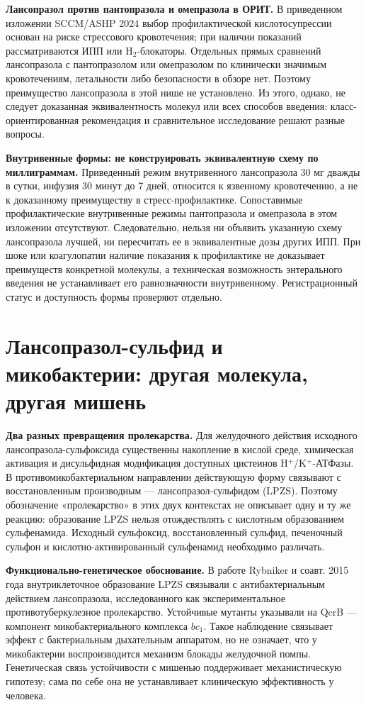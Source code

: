 \documentclass[11pt,a4paper,notitlepage]{report}
\newcommand{\src}[1]{\unskip\space\cite{#1}}
\begin{document}
\textbf{Лансопразол против пантопразола и омепразола в ОРИТ.} В приведенном изложении SCCM/ASHP 2024 выбор профилактической кислотосупрессии основан на риске стрессового кровотечения; при наличии показаний рассматриваются ИПП или H$_2$-блокаторы. Отдельных прямых сравнений лансопразола с пантопразолом или омепразолом по клинически значимым кровотечениям, летальности либо безопасности в обзоре нет. Поэтому преимущество лансопразола в этой нише не установлено. Из этого, однако, не следует доказанная эквивалентность молекул или всех способов введения: класс-ориентированная рекомендация и сравнительное исследование решают разные вопросы.\src{sccm}

\textbf{Внутривенные формы: не конструировать эквивалентную схему по миллиграммам.} Приведенный режим внутривенного лансопразола 30 мг дважды в сутки, инфузия 30 минут до 7 дней, относится к язвенному кровотечению, а не к доказанному преимуществу в стресс-профилактике. Сопоставимые профилактические внутривенные режимы пантопразола и омепразола в этом изложении отсутствуют. Следовательно, нельзя ни объявить указанную схему лансопразола лучшей, ни пересчитать ее в эквивалентные дозы других ИПП. При шоке или коагулопатии наличие показания к профилактике не доказывает преимуществ конкретной молекулы, а техническая возможность энтерального введения не устанавливает его равнозначности внутривенному. Регистрационный статус и доступность формы проверяют отдельно.\src{rfpud,sccm,esge2026,uslabel,grls}

\section{Лансопразол-сульфид и микобактерии: другая молекула, другая мишень}
\label{sec:mycobacteria}
{\raggedright \textbf{Два разных превращения пролекарства.} Для желудочного действия исходного лансопразола-сульфоксида существенны накопление в кислой среде, химическая активация и дисульфидная модификация доступных цистеинов H$^+$/K$^+$-АТФазы. В противомикобактериальном направлении действующую форму связывают с восстановленным производным --- лансопразол-сульфидом (LPZS). Поэтому обозначение «пролекарство» в этих двух контекстах не описывает одну и ту же реакцию: образование LPZS нельзя отождествлять с кислотным образованием сульфенамида. Исходный сульфоксид, восстановленный сульфид, печеночный сульфон и кислотно-активированный сульфенамид необходимо различать.\src{moltb,molnagaya89,molcys}\par}

\textbf{Функционально-генетическое обоснование.} В работе Rybniker и соавт. 2015 года внутриклеточное образование LPZS связывали с антибактериальным действием лансопразола, исследованного как экспериментальное противотуберкулезное пролекарство. Устойчивые мутанты указывали на QcrB --- компонент микобактериального комплекса $bc_1$. Такое наблюдение связывает эффект с бактериальным дыхательным аппаратом, но не означает, что у микобактерии воспроизводится механизм блокады желудочной помпы. Генетическая связь устойчивости с мишенью поддерживает механистическую гипотезу; сама по себе она не устанавливает клиническую эффективность у человека.\src{moltb}
\end{document}
